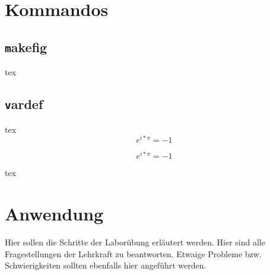 \newpage
\section{Kommandos}\label{sec:Kommandos}
\subsection{\texttt makefig}

\begin{listing}
\begin{code}{tex}
\end{code}
\caption{\texttt makefig}
\label{lst:makefig}
\end{listing}

\subsection{\texttt vardef}
\begin{listing}
\begin{code}{tex}
$$e^{i*\pi} = -1$$
\end{code}

$$e^{i*\pi} = -1$$

\begin{code}[firstnumber=last]{tex}
\begin{vardef}
\end{vardef}
\end{code}

\begin{vardef}
\end{vardef}

\caption{\texttt vardef}
\label{lst:vardef}
\end{listing}

\newpage
\section{Anwendung}\label{sec:Anwendung}
Hier sollen die Schritte der Laborübung erläutert werden. Hier sind alle Fragestellungen der Lehrkraft zu beantworten. Etwaige Probleme bzw. Schwierigkeiten sollten ebenfalls hier angeführt werden.

